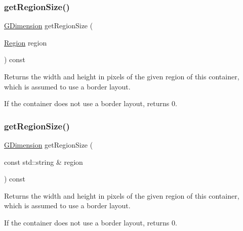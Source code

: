 \subsubsection{\texorpdfstring{get\+Region\+Size()}{getRegionSize()}\hspace{0.1cm}{\footnotesize\ttfamily [1/2]}}
{\footnotesize\ttfamily \mbox{\hyperlink{classGDimension}{G\+Dimension}} get\+Region\+Size (\begin{DoxyParamCaption}\item[{\mbox{\hyperlink{classGContainer_a81a01a86de31071a92e6cce0bab9bc4b}{Region}}}]{region }\end{DoxyParamCaption}) const\hspace{0.3cm}{\ttfamily [virtual]}}



Returns the width and height in pixels of the given region of this container, which is assumed to use a border layout. 

If the container does not use a border layout, returns 0. \mbox{\label{classGContainer_a68b18b38b72cb8779fca0c3882549a6b}} 
\subsubsection{\texorpdfstring{get\+Region\+Size()}{getRegionSize()}\hspace{0.1cm}{\footnotesize\ttfamily [2/2]}}
{\footnotesize\ttfamily \mbox{\hyperlink{classGDimension}{G\+Dimension}} get\+Region\+Size (\begin{DoxyParamCaption}\item[{const std\+::string \&}]{region }\end{DoxyParamCaption}) const\hspace{0.3cm}{\ttfamily [virtual]}}



Returns the width and height in pixels of the given region of this container, which is assumed to use a border layout. 

If the container does not use a border layout, returns 0. \mbox{\label{classGContainer_a96e2005c3f447a8679c3c32d3fc02de1}} 
